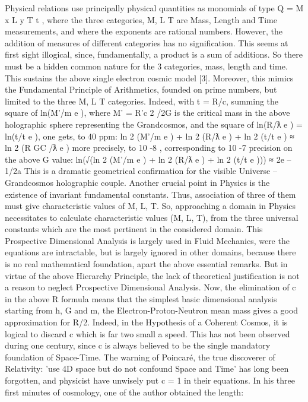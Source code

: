 Physical relations use principally physical quantities as monomials of type Q = M x L y T t , where
the three categories, M, L T are Mass, Length and Time measurements, and where the exponents are
rational numbers. However, the addition of measures of different categories has no signification.
This seems at first sight illogical, since, fundamentally, a product is a sum of additions. So there
must be a hidden common nature for the 3 categories, mass, length and time. This sustains the
above single electron cosmic model [3]. Moreover, this mimics the Fundamental Principle of
Arithmetics, founded on prime numbers, but limited to the three M, L T categories. Indeed, with t =
R/c, summing the square of ln(M'/m e ), where M' = R'c 2 /2G is the critical mass in the above
holographic sphere representing the Grandcosmos, and the square of ln(R/ƛ e ) = ln(t/t e ), one gets, to
40 ppm:
ln 2 (M'/m e ) + ln 2 (R/ƛ e ) + ln 2 (t/t e ) ≈ ln 2 (R GC /ƛ e )
more precisely, to 10 -8 , corresponding to 10 -7 precision on the above G value:
ln(√(ln 2 (M'/m e ) + ln 2 (R/ƛ e ) + ln 2 (t/t e ))) ≈ 2e – 1/2a
This is a dramatic geometrical confirmation for the visible Universe – Grandcosmos holographic
couple.
Another crucial point in Physics is the existence of invariant fundamental constants. Thus,
association of three of them must give characteristic values of M, L, T. So, approaching a domain in
Physics necessitates to calculate characteristic values (M, L, T), from the three universal constants
which are the most pertinent in the considered domain. This Prospective Dimensional Analysis is
largely used in Fluid Mechanics, were the equations are intractable, but is largely ignored in other
domains, because there is no real mathematical foundation, apart the above essential remarks. But
in virtue of the above Hierarchy Principle, the lack of theoretical justification is not a reason to
neglect Prospective Dimensional Analysis.
Now, the elimination of c in the above R formula means that the simplest basic dimensional
analysis starting from ħ, G and m, the Electron-Proton-Neutron mean mass gives a good
approximation for R/2. Indeed, in the Hypothesis of a Coherent Cosmos, it is logical to discard c
which is far two small a speed. This has not been observed during one century, since c is always
believed to be the single mandatory foundation of Space-Time. The warning of Poincaré, the true
discoverer of Relativity: 'use 4D space but do not confound Space and Time' has long been
forgotten, and physicist have unwisely put c = 1 in their equations.
In his three first minutes of cosmology, one of the author obtained the length:
